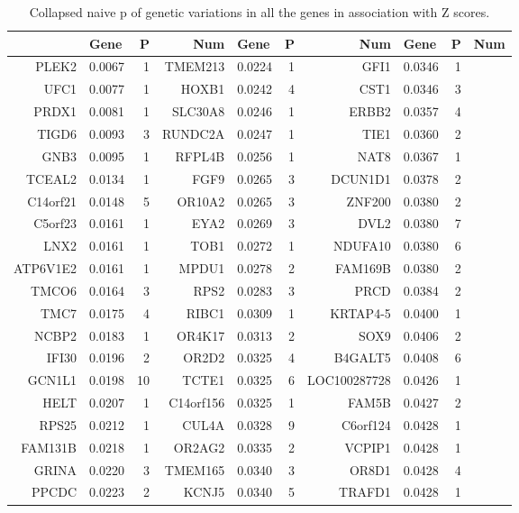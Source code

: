 \documentclass{article}
\begin{document}
\begin{table}[tbp]
\centering
\caption{Collapsed naive p of genetic variations in all the genes in association with Z scores.} 
\label{tab:lowPall}
{\small
\begin{tabular}{rlrrlrrlrr}
  \hline
 & Gene & P & Num & Gene & P & Num & Gene & P & Num \\ 
  \hline
PLEK2 & 0.0067 & 1 & TMEM213 & 0.0224 & 1 & GFI1 & 0.0346 & 1 \\ 
UFC1 & 0.0077 & 1 & HOXB1 & 0.0242 & 4 & CST1 & 0.0346 & 3 \\ 
PRDX1 & 0.0081 & 1 & SLC30A8 & 0.0246 & 1 & ERBB2 & 0.0357 & 4 \\ 
TIGD6 & 0.0093 & 3 & RUNDC2A & 0.0247 & 1 & TIE1 & 0.0360 & 2 \\ 
GNB3 & 0.0095 & 1 & RFPL4B & 0.0256 & 1 & NAT8 & 0.0367 & 1 \\ 
TCEAL2 & 0.0134 & 1 & FGF9 & 0.0265 & 3 & DCUN1D1 & 0.0378 & 2 \\ 
 C14orf21 & 0.0148 & 5 & OR10A2 & 0.0265 & 3 & ZNF200 & 0.0380 & 2 \\ 
C5orf23 & 0.0161 & 1 & EYA2 & 0.0269 & 3 & DVL2 & 0.0380 & 7 \\ 
 LNX2 & 0.0161 & 1 & TOB1 & 0.0272 & 1 & NDUFA10 & 0.0380 & 6 \\ 
ATP6V1E2 & 0.0161 & 1 & MPDU1 & 0.0278 & 2 & FAM169B & 0.0380 & 2 \\ 
 TMCO6 & 0.0164 & 3 & RPS2 & 0.0283 & 3 & PRCD & 0.0384 & 2 \\ 
TMC7 & 0.0175 & 4 & RIBC1 & 0.0309 & 1 & KRTAP4-5 & 0.0400 & 1 \\ 
NCBP2 & 0.0183 & 1 & OR4K17 & 0.0313 & 2 & SOX9 & 0.0406 & 2 \\ 
 IFI30 & 0.0196 & 2 & OR2D2 & 0.0325 & 4 & B4GALT5 & 0.0408 & 6 \\ 
GCN1L1 & 0.0198 & 10 & TCTE1 & 0.0325 & 6 & LOC100287728 & 0.0426 & 1 \\ 
 HELT & 0.0207 & 1 & C14orf156 & 0.0325 & 1 & FAM5B & 0.0427 & 2 \\ 
 RPS25 & 0.0212 & 1 & CUL4A & 0.0328 & 9 & C6orf124 & 0.0428 & 1 \\ 
 FAM131B & 0.0218 & 1 & OR2AG2 & 0.0335 & 2 & VCPIP1 & 0.0428 & 1 \\ 
GRINA & 0.0220 & 3 & TMEM165 & 0.0340 & 3 & OR8D1 & 0.0428 & 4 \\ 
 PPCDC & 0.0223 & 2 & KCNJ5 & 0.0340 & 5 & TRAFD1 & 0.0428 & 1 \\ 
   \hline
\end{tabular}
}
\end{table}
\end{document}
